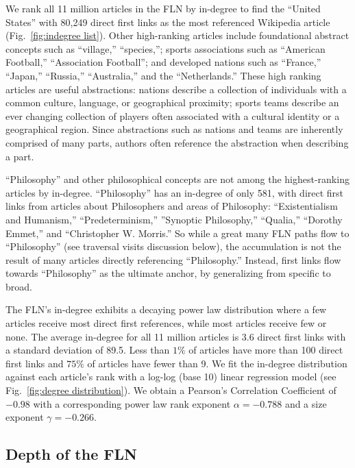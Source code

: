 \documentclass[pre,twocolumn,twoside,byrevtex,superscriptaddress,floatfix]{revtex4-1}
\begin{document}
We rank all 11 million articles in the FLN by in-degree to find 
the ``United States'' with 80,249 direct first links as the most referenced
Wikipedia article 
(Fig.~\ref{fig:indegree list}). 
Other high-ranking articles
include foundational abstract concepts such as ``village,'' ``species,''; 
sports associations such as ``American Football,'' ``Association Football''; 
and developed nations such as ``France,'' ``Japan,'' ``Russia,'' ``Australia,'' and 
the ``Netherlands.'' These high ranking articles are useful abstractions: nations
describe a collection of individuals with a common culture, language, or 
geographical proximity; sports teams describe an ever changing collection of 
players often associated with a cultural identity or a geographical 
region. 
Since abstractions such as nations and teams are inherently comprised
of many parts, authors often reference the abstraction when describing a part.

``Philosophy'' and other philosophical concepts
are not among the highest-ranking articles by in-degree.
``Philosophy'' has an in-degree of only 581, with direct first links from articles about Philosophers and areas of Philosophy: ``Existentialism and Humanism,'' ``Predeterminism,'' ''Synoptic Philosophy,'' ``Qualia,'' ``Dorothy Emmet,'' and ``Christopher W. Morris.''
So while a great many FLN paths flow to 
``Philosophy'' (see traversal visits discussion below), 
the accumulation is not the 
result of many articles directly referencing ``Philosophy.'' 
Instead, first links flow towards ``Philosophy'' as the 
ultimate anchor, by generalizing from specific to broad.

The FLN's in-degree exhibits a decaying power law distribution where a few articles 
receive most direct first references, while most articles receive few or none.
The average in-degree for all 11 million articles is 3.6 direct first links with a standard deviation of 89.5.
Less than $1\%$ of articles have more than 100 direct first links and $75\%$ of articles
have fewer than 9. 
We fit the in-degree distribution against each article's rank with a log-log (base 10) linear regression model
(see Fig.~\ref{fig:degree distribution}).
We obtain a Pearson's Correlation Coefficient of $-0.98$
with a corresponding  power law rank exponent $\alpha = -0.788$ and a size exponent $\gamma = -0.266$. 

\subsection{Depth of the FLN}
\end{document}
